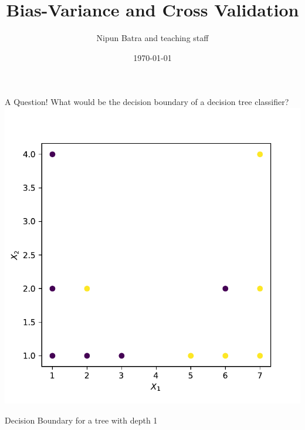 \documentclass{beamer}
\title{Bias-Variance and Cross Validation}
\date{\today}
\author{Nipun Batra and teaching staff}
\institute{IIT Gandhinagar}
\begin{document}
	\maketitle

	\begin{frame}{A Question!}
	What would be the decision boundary of a decision tree classifier?
	\centering
	\includegraphics[scale=0.55]{dataset-1}
	\end{frame}

	\begin{frame}{Decision Boundary for a tree with depth 1}
	\begin{figure}%
	    \centering
	    \qquad
	    \label{fig:example}%
	\end{figure}
	\end{frame}
	
\end{document}
